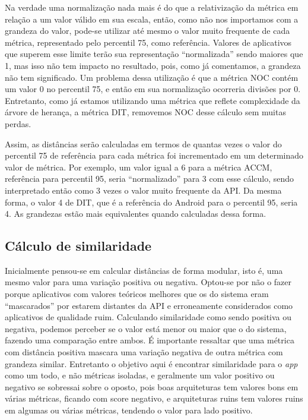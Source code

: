 Na verdade uma normalização nada mais é do que a relativização da métrica em relação a um valor válido em sua escala, então, como não nos importamos com a grandeza do valor, pode-se utilizar até mesmo o valor muito frequente de cada métrica, representado pelo percentil 75, como referência. Valores de aplicativos que superem esse limite terão sua representação ``normalizada'' sendo maiores que 1, mas isso não tem impacto no resultado, pois, como já comentamos, a grandeza não tem significado. Um problema dessa utilização é que a métrica NOC contém um valor 0 no percentil 75, e então em sua normalização ocorreria divisões por 0. Entretanto, como já estamos utilizando uma métrica que reflete complexidade da árvore de herança, a métrica DIT, removemos NOC desse cálculo sem muitas perdas.

Assim, as distâncias serão calculadas em termos de quantas vezes o valor do percentil 75 de referência para cada métrica foi incrementado em um determinado valor de métrica. Por exemplo, um valor igual a 6 para a métrica ACCM, referência para percentil 95, seria ``normalizado'' para 3 com esse cálculo, sendo interpretado então como 3 vezes o valor muito frequente da API. Da mesma forma, o valor 4 de DIT, que é a referência do Android para o percentil 95, seria 4. As grandezas estão mais equivalentes quando calculadas dessa forma.

\subsection{Cálculo de similaridade}

Inicialmente pensou-se em calcular distâncias de forma modular, isto é, uma mesmo valor para uma variação positiva ou negativa. Optou-se por não o fazer porque aplicativos com valores teóricos melhores que os do sistema eram ``mascarados'' por estarem distantes da API e erroneamente considerados como aplicativos de qualidade ruim.  Calculando similaridade como sendo positiva ou negativa, podemos perceber se o valor está menor ou maior que o do sistema, fazendo uma comparação entre ambos. É importante ressaltar que uma métrica com distância positiva mascara uma variação negativa de outra métrica com grandeza similar. Entretanto o objetivo aqui é encontrar similaridade para o \textit{app} como um todo, e não métricas isoladas, e geralmente um valor positivo ou negativo se sobressai sobre o oposto, pois boas arquiteturas tem valores bons em várias métricas, ficando com score negativo, e arquiteturas ruins tem valores ruins em algumas ou várias métricas, tendendo o valor para lado positivo. 

